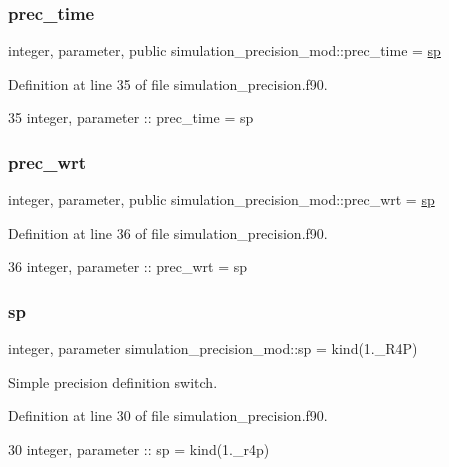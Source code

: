 \subsubsection{\texorpdfstring{prec\+\_\+time}{prec\_time}}
{\footnotesize\ttfamily integer, parameter, public simulation\+\_\+precision\+\_\+mod\+::prec\+\_\+time = \mbox{\hyperlink{namespacesimulation__precision__mod_a15b1ab993f9b11430e9d9d3dc6c77614}{sp}}}



Definition at line 35 of file simulation\+\_\+precision.\+f90.


\begin{DoxyCode}
35     \textcolor{keywordtype}{integer},  \textcolor{keywordtype}{parameter} :: prec\_time = sp
\end{DoxyCode}
\mbox{\label{namespacesimulation__precision__mod_ad515822198607dfee68a6ed8b246c7da}} 
\subsubsection{\texorpdfstring{prec\+\_\+wrt}{prec\_wrt}}
{\footnotesize\ttfamily integer, parameter, public simulation\+\_\+precision\+\_\+mod\+::prec\+\_\+wrt = \mbox{\hyperlink{namespacesimulation__precision__mod_a15b1ab993f9b11430e9d9d3dc6c77614}{sp}}}



Definition at line 36 of file simulation\+\_\+precision.\+f90.


\begin{DoxyCode}
36     \textcolor{keywordtype}{integer},  \textcolor{keywordtype}{parameter} :: prec\_wrt  = sp
\end{DoxyCode}
\mbox{\label{namespacesimulation__precision__mod_a15b1ab993f9b11430e9d9d3dc6c77614}} 
\subsubsection{\texorpdfstring{sp}{sp}}
{\footnotesize\ttfamily integer, parameter simulation\+\_\+precision\+\_\+mod\+::sp = kind(1.\+\_\+\+R4P)\hspace{0.3cm}{\ttfamily [private]}}



Simple precision definition switch. 



Definition at line 30 of file simulation\+\_\+precision.\+f90.


\begin{DoxyCode}
30     \textcolor{keywordtype}{integer},  \textcolor{keywordtype}{parameter} :: sp  = kind(1.\_r4p)   
\end{DoxyCode}

